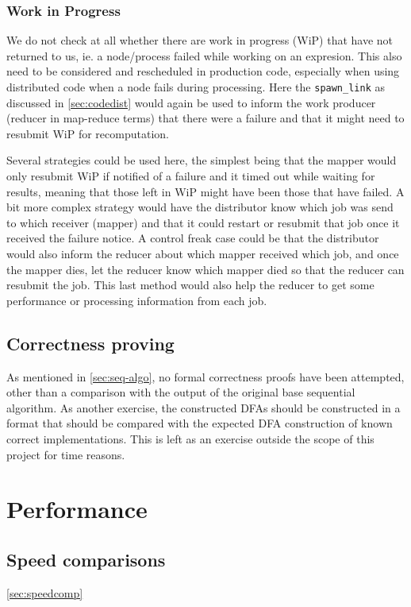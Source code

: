 \documentclass[a4paper,11pt]{report}
\begin{document}
\subsection{Work in Progress}

We do not check at all whether there are work in progress (WiP) that
have not returned to us, ie. a node/process failed while working on an
expresion. This also need to be considered and rescheduled in
production code, especially when using distributed code when a node
fails during processing. Here the
\texttt{spawn\_link} as discussed in \autoref{sec:codedist} would again be
used to inform the work producer (reducer in map-reduce terms) that
there were a failure and that it might need to resubmit WiP for
recomputation.

Several strategies could be used here, the simplest being that the
mapper would only resubmit WiP if notified of a failure and it timed
out while waiting for results, meaning that those left in WiP might
have been those that have failed. A bit more complex strategy would
have the distributor know which job was send to which receiver
(mapper) and that it could restart or resubmit that job once it
received the failure notice. A control freak case could be that the
distributor would also inform the reducer about which mapper received
which job, and once the mapper dies, let the reducer know which mapper
died so that the reducer can resubmit the job. This last method would
also help the reducer to get some performance or processing
information from each job.

\section{Correctness proving}

As mentioned in \autoref{sec:seq-algo}, no formal correctness proofs
have been attempted, other than a comparison with the output of the
original base
sequential algorithm. As another exercise, the constructed DFAs should
be constructed in a format that should be compared with the expected
DFA construction of known correct implementations. This is left as an
exercise outside the scope of this project for time reasons.



\chapter{Performance}
\section{Speed comparisons}
\autoref{sec:speedcomp}
\end{document}
